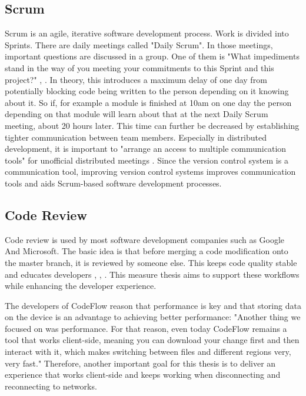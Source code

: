 \subsection{Scrum}
Scrum is an agile, iterative software development process. Work is divided into Sprints. There are daily meetings called "Daily Scrum". In those meetings, important questions are discussed in a group. One of them is "What impediments stand in the way of you meeting your commitments to this Sprint and this project?" \cite{schwaber2004agile}, \cite{10.1007/978-1-4471-0947-1_11}.
In theory, this introduces a maximum delay of one day from potentially blocking code being written to the person depending on it knowing about it.
So if, for example a module is finished at 10am on one day the person depending on that module will learn about that at the next Daily Scrum meeting, about 20 hours later. This time can further be decreased by establishing tighter communication between team members.
Especially in distributed development, it is important to "arrange an access to multiple communication tools" \cite{5196933} for unofficial distributed meetings \cite{4638656}.
Since the version control system is a communication tool, improving version control systems improves communication tools and aids Scrum-based software development processes.

\subsection{Code Review}

Code review is used by most software development companies such as Google And Microsoft. The basic idea is that before merging a code modification onto the master branch, it is reviewed by someone else. This keeps code quality stable and educates developers \cite{SadowskiSoederbergChurchSipkoBacchelli:2018:Moderncodereview:acasestudyatgoogle}, \cite{Bacchelli:2013:EOC:2486788.2486882}, \cite{7081824}. This measure thesis aims to support these workflows while enhancing the developer experience. 

The developers of CodeFlow reason that performance is key and that storing data on the device is an advantage to achieving better performance: "Another thing we focused on was performance. For that
reason, even today CodeFlow remains a tool that works
client-side, meaning you can download your change first
and then interact with it, which makes switching between
files and different regions very, very fast." \cite{CzerwonkaGreilerBirdPanjerCoatta:2018:CodeFlow:ImprovingtheCodeReviewProcessatMicrosoft} Therefore, another important goal for this thesis is to deliver an experience that works client-side and keeps working when disconnecting and reconnecting to networks.
